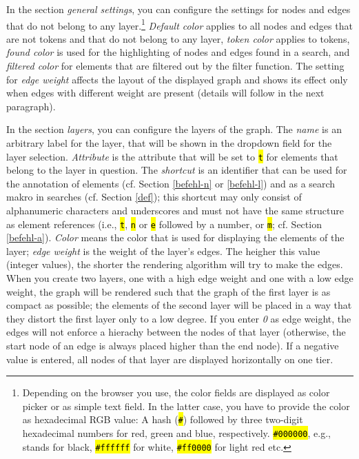 \documentclass[12pt]{scrartcl}
\newcommand{\code}[1]{\hl{\texttt{#1}}}
\begin{document}
In the section \textit{general settings}, you can configure the settings for nodes and edges that do not belong to any layer.\footnote{Depending on the browser you use, the color fields are displayed as color picker or as simple text field. In the latter case, you have to provide the color as hexadecimal RGB value: A hash (\code{\#}) followed by three two-digit hexadecimal numbers for red, green and blue, respectively. \code{\#000000}, e.g., stands for black, \code{\#ffffff} for white, \code{\#ff0000} for light red etc.}
\textit{Default color} applies to all nodes and edges that are not tokens and that do not belong to any layer, \textit{token color} applies to tokens, \textit{found color} is used for the highlighting of nodes and edges found in a search, and \textit{filtered color} for elements that are filtered out by the filter function.
The setting for \textit{edge weight} affects the layout of the displayed graph and shows its effect only when edges with different weight are present (details will follow in the next paragraph).

In the section \textit{layers}, you can configure the layers of the graph.
The \textit{name} is an arbitrary label for the layer, that will be shown in the dropdown field for the layer selection.
\textit{Attribute} is the attribute that will be set to \code{t} for elements that belong to the layer in question.
The \textit{shortcut} is an identifier that can be used for the annotation of elements (cf. Section \ref{befehl-n} or \ref{befehl-l}) and as a search makro in searches (cf. Section \ref{def}); this shortcut may only consist of alphanumeric characters and underscores and must not have the same structure as element references (i.e., \code{t}, \code{n} or \code{e} followed by a number, or  \code{m}; cf. Section \ref{befehl-a}).
\textit{Color} means the color that is used for displaying the elements of the layer; \textit{edge weight} is the weight of the layer’s edges.
The heigher this value (integer values), the shorter the rendering algorithm will try to make the edges.
When you create two layers, one with a high edge weight and one with a low edge weight, the graph will be rendered such that the graph of the first layer is as compact as possible; the elements of the second layer will be placed in a way that they distort the first layer only to a low degree.
If you enter \textit{0} as edge weight, the edges will not enforce a hierachy between the nodes of that layer (otherwise, the start node of an edge is always placed higher than the end node).
If a negative value is entered, all nodes of that layer are displayed horizontally on one tier.
\end{document}
